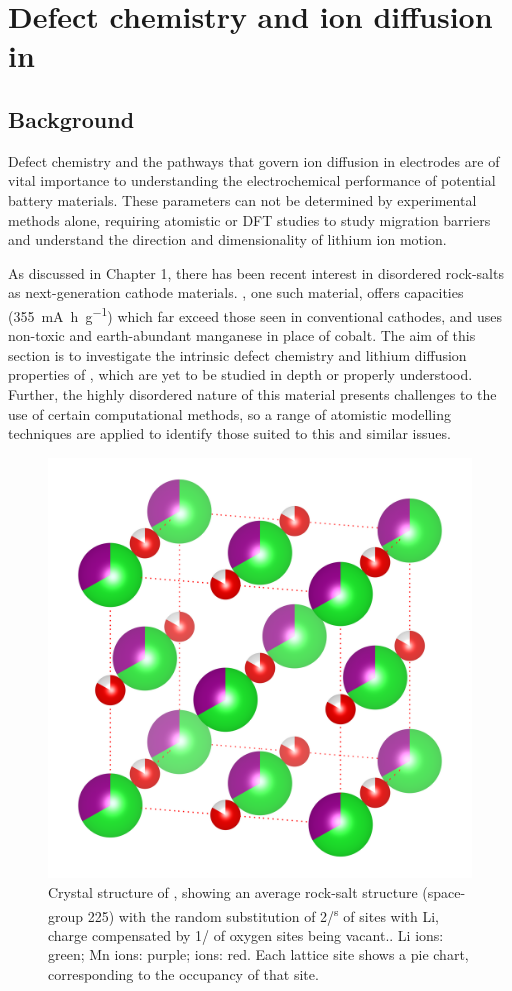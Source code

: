 \chapter{Defect chemistry and  ion diffusion in }
\section{Background}
Defect chemistry and the pathways that govern ion diffusion in electrodes are of vital importance to understanding the electrochemical performance of potential battery materials.
These parameters can not be determined by experimental methods alone, requiring atomistic or DFT studies to study migration barriers and understand the direction and dimensionality of lithium ion motion.

As discussed in Chapter 1, there has been recent interest in disordered rock-salts as next-generation cathode materials.
, one such material, offers capacities (\SI{355}{\milli\ampere\hour\per\gram}) which far exceed those seen in conventional cathodes, and uses non-toxic and earth-abundant manganese in place of cobalt.
The aim of this section is to investigate the intrinsic defect chemistry and lithium diffusion properties of , which are yet to be studied in depth or properly understood.
Further, the highly disordered nature of this material presents challenges to the use of certain computational methods, so a range of atomistic modelling techniques are applied to identify those suited to this and similar issues.

\newpage
\begin{figure}[h]
\centering
\vspace{1cm}
\includegraphics[width=0.8\linewidth]{figures/structures/Li4Mn2O5_compressed}
\caption[Crystal structure of ]{Crystal structure of , showing an average  rock-salt structure (space-group 225) with the random substitution of 2/\textsuperscript{s} of  sites with Li, charge compensated by 1/ of oxygen sites being vacant.. Li ions: green; Mn ions: purple;  ions: red. Each lattice site shows a pie chart, corresponding to the occupancy of that site.}
\label{fig:Li4Mn2O5-average}
\end{figure}

